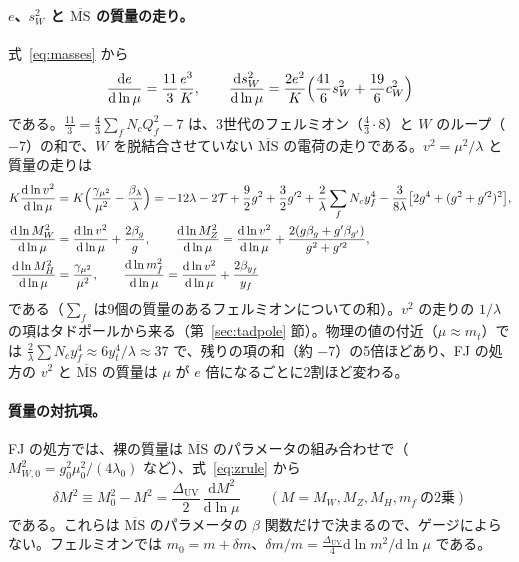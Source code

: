 \documentclass[a4paper,10pt]{ltjsarticle}
\newcommand{\dd}{\mathrm{d}}
\newcommand{\MSbar}{\overline{\mathrm{MS}}}
\newcommand{\DUV}{\Delta_{\mathrm{UV}}}
\newcommand{\sw}{s_W}
\newcommand{\cw}{c_W}
\begin{document}
\paragraph{$e$、$\sw^2$ と $\MSbar$ の質量の走り。}式~\eqref{eq:masses} から
\begin{equation}
\frac{\dd e}{\dd\ln\mu}=\frac{11}3\frac{e^3}K,\qquad
\frac{\dd\sw^2}{\dd\ln\mu}=\frac{2e^2}K\Bigl(\frac{41}6\sw^2+\frac{19}6\cw^2\Bigr)
\label{eq:erun}
\end{equation}
である。$\frac{11}3=\frac43\sum_fN_cQ_f^2-7$ は、3世代のフェルミオン（$\frac43\cdot8$）と $W$ のループ（$-7$）の和で、$W$ を脱結合させていない $\MSbar$ の電荷の走りである。$v^2=\mu^2/\lambda$ と質量の走りは
\begin{equation}
\begin{aligned}
K\frac{\dd\ln v^2}{\dd\ln\mu}&=K\Bigl(\frac{\gamma_{\mu^2}}{\mu^2}-\frac{\beta_\lambda}\lambda\Bigr)
=-12\lambda-2\mathcal T+\frac92g^2+\frac32g'^2+\frac2\lambda\sum_fN_cy_f^4-\frac3{8\lambda}\bigl[2g^4+(g^2+g'^2)^2\bigr],\\
\frac{\dd\ln M_W^2}{\dd\ln\mu}&=\frac{\dd\ln v^2}{\dd\ln\mu}+\frac{2\beta_g}g,\qquad
\frac{\dd\ln M_Z^2}{\dd\ln\mu}=\frac{\dd\ln v^2}{\dd\ln\mu}+\frac{2(g\beta_g+g'\beta_{g'})}{g^2+g'^2},\\
\frac{\dd\ln M_H^2}{\dd\ln\mu}&=\frac{\gamma_{\mu^2}}{\mu^2},\qquad
\frac{\dd\ln m_f^2}{\dd\ln\mu}=\frac{\dd\ln v^2}{\dd\ln\mu}+\frac{2\beta_{y_f}}{y_f}
\end{aligned}
\label{eq:vrun}
\end{equation}
である（$\sum_f$ は9個の質量のあるフェルミオンについての和）。$v^2$ の走りの $1/\lambda$ の項はタドポールから来る（第~\ref{sec:tadpole} 節）。物理の値の付近（$\mu\approx m_t$）では $\frac2\lambda\sum N_cy_f^4\approx6y_t^4/\lambda\approx37$ で、残りの項の和（約 $-7$）の5倍ほどあり、FJ の処方の $v^2$ と $\MSbar$ の質量は $\mu$ が $e$ 倍になるごとに2割ほど変わる。

\paragraph{質量の対抗項。}FJ の処方では、裸の質量は $\MSbar$ のパラメータの組み合わせで（$M_{W,0}^2=g_0^2\mu_0^2/(4\lambda_0)$ など）、式~\eqref{eq:zrule} から
\begin{equation}
\delta M^2\equiv M_0^2-M^2=\frac{\DUV}2\,\frac{\dd M^2}{\dd\ln\mu}\qquad(M=M_W,M_Z,M_H,m_f\ \text{の2乗})
\label{eq:dM2}
\end{equation}
である。これらは $\MSbar$ のパラメータの $\beta$ 関数だけで決まるので、ゲージによらない。フェルミオンでは $m_0=m+\delta m$、$\delta m/m=\frac{\DUV}4\dd\ln m^2/\dd\ln\mu$ である。
\end{document}
